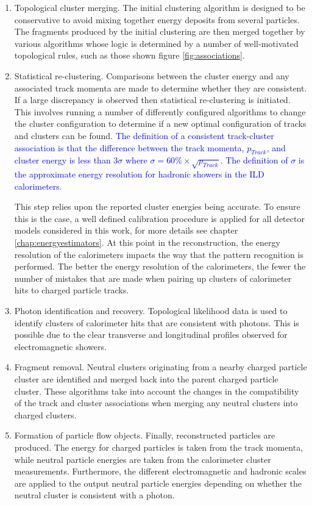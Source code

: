 \begin{enumerate}
\item Topological cluster merging.  The initial clustering algorithm is designed to be conservative to avoid mixing together energy deposits from several particles.  The fragments produced by the initial clustering are then merged together by various algorithms whose logic is determined by a number of well-motivated topological rules, such as those shown figure \ref{fig:associations}.  
\item Statistical re-clustering.  Comparisons between the cluster energy and any associated track momenta are made to determine whether they are consistent.  
If a large discrepancy is observed then statistical re-clustering is initiated.  This involves running a number of differently configured algorithms to change the cluster configuration to determine if a new optimal configuration of tracks and clusters can be found.  \textcolor{blue}{The definition of a consistent track-cluster association is that the difference between the track momenta, $p_{Track}$, and cluster energy is less than 3$\sigma$ where $\sigma = 60\% \times \sqrt{p_{Track}}$.  The definition of $\sigma$ is the approximate energy resolution for hadronic showers in the ILD calorimeters.}  

This step relies upon the reported cluster energies being accurate.  To ensure this is the case, a well defined calibration procedure is applied for all detector models considered in this work, for more details see chapter \ref{chap:energyestimators}.  At this point in the reconstruction, the energy resolution of the calorimeters impacts the way that the pattern recognition is performed.  The better the energy resolution of the calorimeters, the fewer the number of mistakes that are made when pairing up clusters of calorimeter hits to charged particle tracks.    

\item Photon identification and recovery.  Topological likelihood data is used to identify clusters of calorimeter hits that are consistent with photons.  This is possible due to the clear transverse and longitudinal profiles observed for electromagnetic showers.  
\item Fragment removal.  Neutral clusters originating from a nearby charged particle cluster are identified and merged back into the parent charged particle cluster.  These algorithms take into account the changes in the compatibility of the track and cluster associations when merging any neutral clusters into charged clusters.  
\item Formation of particle flow objects.  Finally, reconstructed particles are produced.  The energy for charged particles is taken from the track momenta, while neutral particle energies are taken from the calorimeter cluster measurements.  Furthermore, the different electromagnetic and hadronic scales are applied to the output neutral particle energies depending on whether the neutral cluster is consistent with a photon.  
\end{enumerate}

